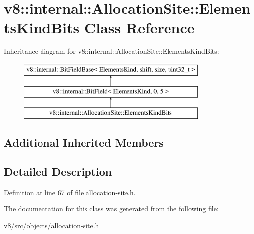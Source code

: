 \hypertarget{classv8_1_1internal_1_1AllocationSite_1_1ElementsKindBits}{}\section{v8\+:\+:internal\+:\+:Allocation\+Site\+:\+:Elements\+Kind\+Bits Class Reference}
\label{classv8_1_1internal_1_1AllocationSite_1_1ElementsKindBits}
Inheritance diagram for v8\+:\+:internal\+:\+:Allocation\+Site\+:\+:Elements\+Kind\+Bits\+:\begin{figure}[H]
\begin{center}
\leavevmode
\includegraphics[height=3.000000cm]{classv8_1_1internal_1_1AllocationSite_1_1ElementsKindBits}
\end{center}
\end{figure}
\subsection*{Additional Inherited Members}


\subsection{Detailed Description}


Definition at line 67 of file allocation-\/site.\+h.



The documentation for this class was generated from the following file\+:\begin{DoxyCompactItemize}
\item 
v8/src/objects/allocation-\/site.\+h\end{DoxyCompactItemize}
